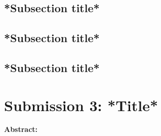 \documentclass[a4paper, 11pt]{article}
\begin{document}
\begin{multicols*}{2}
\vspace{0.3cm}
\subsection{*Subsection title*}




\vspace{0.3cm}
\subsection{*Subsection title*}




\vspace{0.3cm}
\subsection{*Subsection title*}




\end{multicols*}



\newpage
\section{Submission 3: *Title* }

\textbf{Abstract: }
\end{document}
